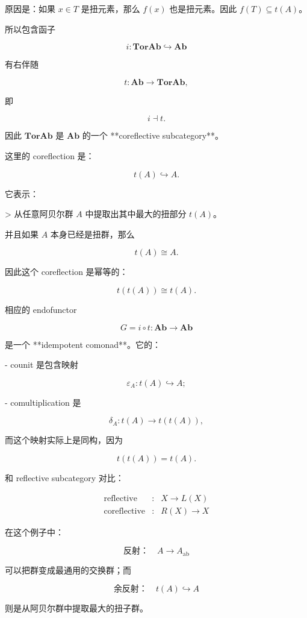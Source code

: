 \documentclass{beamer}
\begin{document}
\begin{frame}
\begin{markdown}
原因是：如果 $x\in T$ 是扭元素，那么 $f(x)$ 也是扭元素。因此 $f(T)\subseteq t(A)$。

所以包含函子

$$
i:\mathbf{TorAb}\hookrightarrow\mathbf{Ab}
$$

有右伴随

$$
t:\mathbf{Ab}\to\mathbf{TorAb},
$$

即

$$
i\dashv t.
$$

因此 $\mathbf{TorAb}$ 是 $\mathbf{Ab}$ 的一个 **coreflective subcategory**。

这里的 coreflection 是：

$$
t(A)\hookrightarrow A.
$$

它表示：

> 从任意阿贝尔群 $A$ 中提取出其中最大的扭部分 $t(A)$。

并且如果 $A$ 本身已经是扭群，那么

$$
t(A)\cong A.
$$

因此这个 coreflection 是幂等的：

$$
t(t(A))\cong t(A).
$$

相应的 endofunctor

$$
G=i\circ t:\mathbf{Ab}\to\mathbf{Ab}
$$

是一个 **idempotent comonad**。它的：

- counit 是包含映射

  $$
  \varepsilon_A:t(A)\hookrightarrow A;
  $$

- comultiplication 是

  $$
  \delta_A:t(A)\to t(t(A)),
  $$

  而这个映射实际上是同构，因为

  $$
  t(t(A))=t(A).
  $$

和 reflective subcategory 对比：

$$
\begin{array}{ccl}
\text{reflective} &:& X\to L(X)\\
\text{coreflective} &:& R(X)\to X
\end{array}
$$

在这个例子中：

$$
\text{反射：}\quad A\to A_{\mathrm{ab}}
$$

可以把群变成最通用的交换群；而

$$
\text{余反射：}\quad t(A)\hookrightarrow A
$$

则是从阿贝尔群中提取最大的扭子群。
\end{markdown}
\end{frame}
\end{document}
